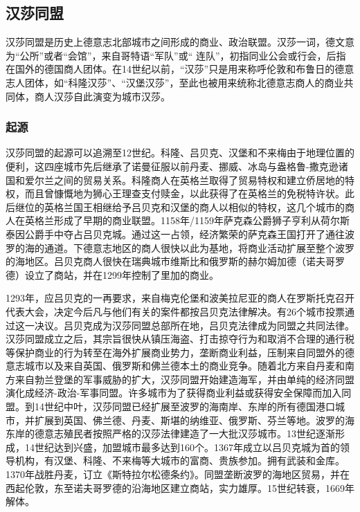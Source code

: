 \subsection{汉莎同盟}

汉莎同盟是历史上德意志北部城市之间形成的商业、政治联盟。汉莎一词，德文意为“公所”或者“会馆”，来自哥特语“军队”或“ 连队”，初指同业公会或行会，后指在国外的德国商人团体。在14世纪以前，“汉莎”只是用来称呼伦敦和布鲁日的德意志人团体，如“科隆汉莎”、“汉堡汉莎”，至此也被用来统称北德意志商人的商业共同体，商人汉莎自此演变为城市汉莎。


\subsubsection{起源}

汉莎同盟的起源可以追溯至12世纪。科隆、吕贝克、汉堡和不来梅由于地理位置的便利，这四座城市先后继承了诺曼征服以前丹麦、挪威、冰岛与盎格鲁-撒克逊诸国和爱尔兰之间的贸易关系。科隆商人在英格兰取得了贸易特权和建立侨居地的特权，而且曾慷慨地为狮心王理查支付赎金，以此获得了在英格兰的免税特许状。此后继位的英格兰国王相继给予吕贝克和汉堡的商人以相似的特权，这几个城市的商人在英格兰形成了早期的商业联盟。1158年/1159年萨克森公爵狮子亨利从荷尔斯泰因公爵手中夺占吕贝克城。通过这一占领，经济繁荣的萨克森王国打开了通往波罗的海的通道。下德意志地区的商人很快以此为基地，将商业活动扩展至整个波罗的海地区。吕贝克商人很快在瑞典城市维斯比和俄罗斯的赫尔姆加德（诺夫哥罗德）设立了商站，并在1299年控制了里加的商业。  


1293年，应吕贝克的一再要求，来自梅克伦堡和波美拉尼亚的商人在罗斯托克召开代表大会，决定今后凡与他们有关的案件都按吕贝克法律解决。有26个城市投票通过这一决议。吕贝克成为汉莎同盟总部所在地，吕贝克法律成为同盟之共同法律。汉莎同盟成立之后，其宗旨很快从镇压海盗、打击掠夺行为和取消不合理的通行税等保护商业的行为转至在海外扩展商业势力，垄断商业利益，压制来自同盟外的德意志城市以及来自英国、俄罗斯和佛兰德本土的商业竞争。随着北方来自丹麦和南方来自勃兰登堡的军事威胁的扩大，汉莎同盟开始建造海军，并由单纯的经济同盟演化成经济-政治-军事同盟。许多城市为了获得商业利益或获得安全保障而加入同盟。到14世纪中叶，汉莎同盟已经扩展至波罗的海南岸、东岸的所有德国港口城市，并扩展到英国、佛兰德、丹麦、斯堪的纳维亚、俄罗斯、芬兰等地。波罗的海东岸的德意志殖民者按照严格的汉莎法律建造了一大批汉莎城市。13世纪逐渐形成，14世纪达到兴盛，加盟城市最多达到160个。1367年成立以吕贝克城为首的领导机构，有汉堡、科隆、不来梅等大城市的富商、贵族参加。拥有武装和金库。1370年战胜丹麦，订立《斯特拉尔松德条约》。同盟垄断波罗的海地区贸易，并在西起伦敦，东至诺夫哥罗德的沿海地区建立商站，实力雄厚。15世纪转衰，1669年解体。


